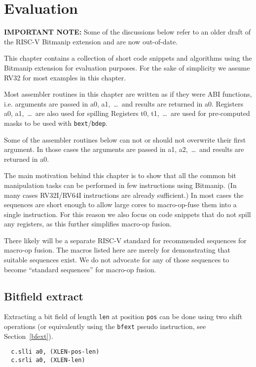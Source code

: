 \chapter{Evaluation}

\textbf{IMPORTANT NOTE:} Some of the discussions below refer to an older draft of the
RISC-V Bitmanip extension and are now out-of-date.

This chapter contains a collection of short code snippets and algorithms using
the Bitmanip extension for evaluation purposes. For the sake of simplicity we
assume RV32 for most examples in this chapter.

Most assembler routines in this chapter are written as if they were ABI functions,
i.e. arguments are passed in a0, a1,~\dots~and results are returned in a0. Registers
a0, a1,~\dots~are also used for spilling Registers t0, t1,~\dots~are used for
pre-computed masks to be used with {\tt bext}/{\tt bdep}.

Some of the assembler routines below can not or should not overwrite their
first argument. In those cases the arguments are passed in a1, a2,~\dots~and
results are returned in a0.

The main motivation behind this chapter is to show that all the common bit
manipulation tasks can be performed in few instructions using Bitmanip. (In
many cases RV32I/RV64I instructions are already sufficient.) In most cases the
sequences are short enough to allow large cores to macro-op-fuse them into a
single instruction. For this reason we also focus on code snippets that do
not spill any registers, as this further simplifies macro-op fusion.

There likely will be a separate RISC-V standard for recommended sequences for
macro-op fusion. The macros listed here are merely for demonstrating that
suitable sequences exist. We do not advocate for any of those sequences to
become ``standard sequences'' for macro-op fusion.

\section{Bitfield extract}

Extracting a bit field of length {\tt len} at position {\tt pos} can be done using
two shift operations (or equivalently using the {\tt bfext} pseudo instruction, see
Section~\ref{bfext}).

\begin{verbatim}
  c.slli a0, (XLEN-pos-len)
  c.srli a0, (XLEN-len)
\end{verbatim}

